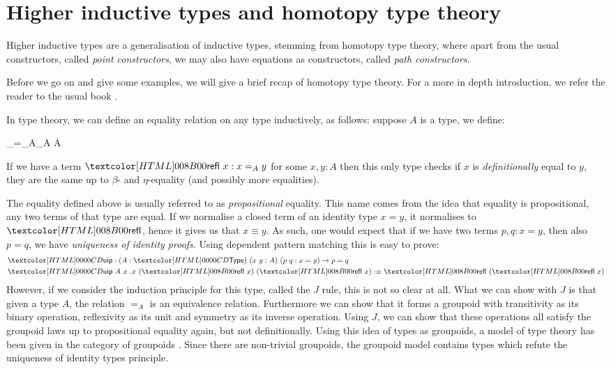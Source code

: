 \section{Higher inductive types and homotopy type theory}

Higher inductive types are a generalisation of inductive types,
stemming from homotopy type theory, where apart from the usual
constructors, called \emph{point constructors}, we may also have
equations as constructors, called \emph{path constructors}.

Before we go on and give some examples, we will give a brief recap of
homotopy type theory. For a more in depth introduction, we refer the
reader to the usual book \cite{UFP2013}.

In type theory, we can define an equality relation on any type
inductively, as follows: suppose $A$ is a type, we define:
%
\begin{datatype}{\_=_A\_}{A \to A \to \Type}
\end{datatype}
%
If we have a term $\refl\ x : x =_A y$ for some $x, y : A$ then this
only type checks if $x$ is \emph{definitionally} equal to $y$, \ie
they are the same up to $\beta$- and $\eta$-equality (and possibly
more equalities). 

The equality defined above is usually referred to as
\emph{propositional} equality. This name comes from the idea that
equality is propositional, \ie any two terms of that type are
equal. If we normalise a closed term of an identity type $x = y$, it
normalises to $\refl$, hence it gives us that $x \equiv y$. As such,
one would expect that if we have two terms $p, q : x = y$, then also
$p = q$, \ie we have \emph{uniqueness of identity proofs}. Using
dependent pattern matching this is easy to prove:
%
\begin{align*}
  &\uip : (A : \Type)\ (x\ y : A)\ (p\ q : x = y) \to p = q \\
  &\uip\ A\ x\ .x\ (\refl\ x)\ (\refl\ x) \ddefeq \refl\ (\refl\ x)
\end{align*}
%
However, if we consider the induction principle for this type, called
the $J$ rule, this is not so clear at all. What we can show with $J$
is that given a type $A$, the relation $=_A$ is an equivalence
relation. Furthermore we can show that it forms a groupoid with
transitivity as its binary operation, reflexivity as its unit and
symmetry as its inverse operation. Using $J$, we can show that these
operations all satisfy the groupoid laws up to propositional equality
again, but not definitionally. Using this idea of types as groupoids,
a model of type theory has been given in the category of groupoids
\cite{Hofmann1998}. Since there are non-trivial groupoids, the
groupoid model contains types which refute the uniqueness of identity
types principle.


